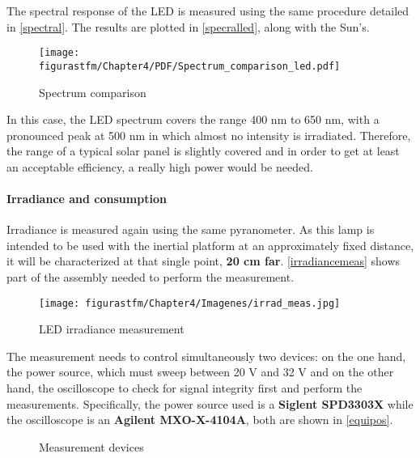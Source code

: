 The spectral response of the \acrshort{LED} is measured using the same procedure detailed in \ref{spectral}. The results are plotted in \autoref{specralled}, along with the Sun's.

\begin{figure} [H]
			\centering
			\texttt{[image: figurastfm/Chapter4/PDF/Spectrum\_comparison\_led.pdf]}
			\caption{Spectrum comparison} \label{specralled}
\end{figure}

In this case, the \acrshort{LED} spectrum covers the range 400 nm to 650 nm, with a pronounced peak at 500 nm in which almost no intensity is irradiated. Therefore, the range of a typical solar panel is slightly covered and in order to get at least an acceptable efficiency, a really high power would be needed.  

\paragraph{Irradiance and consumption}

Irradiance is measured again using the same pyranometer. As this lamp is intended to be used with the inertial platform at an approximately fixed distance, it will be characterized at that single point, \textbf{20 cm far}. \autoref{irradiancemeas} shows part of the assembly needed to perform the measurement. 

\begin{figure} [H]
			\centering
			\texttt{[image: figurastfm/Chapter4/Imagenes/irrad\_meas.jpg]}
			\caption{\acrshort{LED} irradiance measurement} \label{irradiancemeas}
\end{figure}

The measurement needs to control simultaneously two devices: on the one hand, the power source, which must sweep between 20 V and 32 V and on the other hand, the oscilloscope to check for signal integrity first and perform the measurements. Specifically, the power source used is a \textbf{Siglent SPD3303X} while the oscilloscope is an \textbf{Agilent MXO-X-4104A}, both are shown in \autoref{equipos}.

			\begin{figure}[H]
			\centering
			\quad
			\caption{Measurement devices} \label{equipos}
\end{figure}


